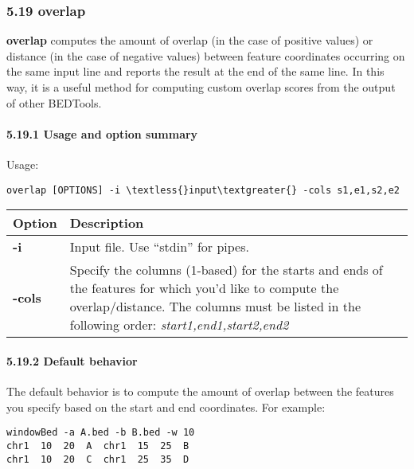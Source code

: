\documentclass[letterpaper,10pt,english]{sphinxmanual}
\begin{document}
\subsubsection{5.19 overlap}
\label{content/overlap::doc}\label{content/overlap:overlap}
\textbf{overlap} computes the amount of overlap (in the case of positive values) or distance (in the case of
negative values) between feature coordinates occurring on the same input line and reports the result at
the end of the same line. In this way, it is a useful method for computing custom overlap scores from
the output of other BEDTools.


\paragraph{5.19.1 Usage and option summary}
\label{content/overlap:usage-and-option-summary}
Usage:

\begin{Verbatim}[commandchars=\\\{\}]
overlap [OPTIONS] -i \textless{}input\textgreater{} -cols s1,e1,s2,e2
\end{Verbatim}

\begin{tabulary}{\linewidth}{|L|L|}
\hline
\textbf{
Option
} & \textbf{
Description
}\\\hline

\textbf{-i}
 & 
Input file. Use ``stdin'' for pipes.
\\\hline

\textbf{-cols}
 & 
Specify the columns (1-based) for the starts and ends of the features for which you'd like to compute the overlap/distance. The columns must be listed in the following order: \emph{start1,end1,start2,end2}
\\\hline
\end{tabulary}



\paragraph{5.19.2 Default behavior}
\label{content/overlap:default-behavior}
The default behavior is to compute the amount of overlap between the features you specify based on the
start and end coordinates. For example:

\begin{Verbatim}[commandchars=\\\{\}]
windowBed -a A.bed -b B.bed -w 10
chr1  10  20  A  chr1  15  25  B
chr1  10  20  C  chr1  25  35  D
\end{Verbatim}
\end{document}
